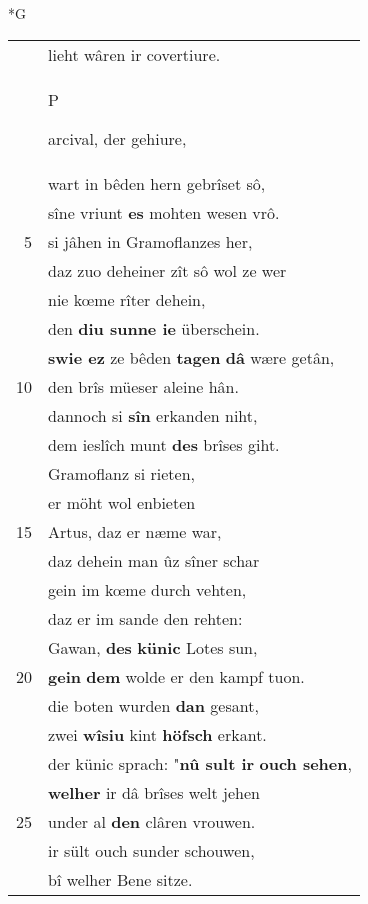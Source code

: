 \documentclass[8pt,a4paper,notitlepage]{article}
\begin{document}
\begin{table}[ht]
\begin{minipage}[t]{0.5\linewidth}
\small
\begin{center}*G
\end{center}
\begin{tabular}{rl}
 & lieht wâren ir covertiure.\\ 
 & \begin{large}P\end{large}arcival, der gehiure,\\ 
 & wart in bêden hern gebrîset sô,\\ 
 & sîne vriunt \textbf{es} mohten wesen vrô.\\ 
5 & si jâhen in Gramoflanzes her,\\ 
 & daz zuo deheiner zît sô wol ze wer\\ 
 & nie kœme rîter dehein,\\ 
 & den \textbf{diu sunne ie} überschein.\\ 
 & \textbf{swie ez} ze bêden \textbf{tagen} \textbf{dâ} wære getân,\\ 
10 & den brîs müeser aleine hân.\\ 
 & dannoch si \textbf{sîn} erkanden niht,\\ 
 & dem ieslîch munt \textbf{des} brîses giht.\\ 
 & Gramoflanz si rieten,\\ 
 & er möht wol enbieten\\ 
15 & Artus, daz er næme war,\\ 
 & daz dehein man ûz sîner schar\\ 
 & gein im kœme durch vehten,\\ 
 & daz er im sande den rehten:\\ 
 & Gawan, \textbf{des} \textbf{künic} Lotes sun,\\ 
20 & \textbf{gein} \textbf{dem} wolde er den kampf tuon.\\ 
 & die boten wurden \textbf{dan} gesant,\\ 
 & zwei \textbf{wîsiu} kint \textbf{höfsch} erkant.\\ 
 & der künic sprach: "\textbf{nû sult ir} \textbf{ouch sehen},\\ 
 & \textbf{welher} ir dâ brîses welt jehen\\ 
25 & under al \textbf{den} clâren vrouwen.\\ 
 & ir sült ouch sunder schouwen,\\ 
 & bî welher Bene sitze.\\ 

\end{tabular}
\end{minipage}
\end{table}
\end{document}
